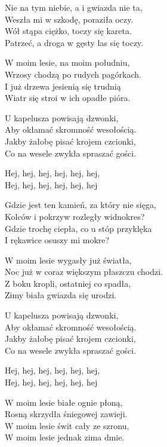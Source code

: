 \begin{text}
    Nie na tym niebie, a i gwiazda nie ta,\\
    Weszła mi w szkodę, poraziła oczy.\\
    Wół stąpa ciężko, toczy się kareta.\\
    Patrzeć, a droga w gęsty las się toczy.

    W moim lesie, na moim południu,\\
    Wrzosy chodzą po rudych pagórkach.\\
    I już drzewa jesienią się trudnią\\
    Wiatr się stroi w ich opadłe pióra.

    U kapelusza powisają dzwonki,\\
    Aby okłamać skromność wesołością.\\
    Jakby żałobę pisać krojem czcionki,\\
    Co na wesele zwykła spraszać gości.

    Hej, hej, hej, hej, hej, hej,\\
    Hej, hej, hej, hej, hej, hej

    Gdzie jest ten kamień, za który nie sięga,\\
    Kolców i pokrzyw rozległy widnokres?\\
    Gdzie trochę ciepła, co u stóp przyklęka\\
    I rękawice osuszy mi mokre?

    W moim lesie wygasły już światła,\\
    Noc już w coraz większym płaszczu chodzi.\\
    Z boku kropli, ostatniej co spadła,\\
    Zimy biała gwiazda się urodzi.

    U kapelusza powisają dzwonki,\\
    Aby okłamać skromność wesołością.\\
    Jakby żałobę pisać krojem czcionki,\\
    Co na wesele zwykła spraszać gości.

    Hej, hej, hej, hej, hej, hej,\\
    Hej, hej, hej, hej, hej, hej

    W moim lesie białe ognie płoną,\\
    Rosną skrzydła śniegowej zawieji.\\
    W moim lesie świt cały ze szronu,\\
    W moim lesie jednak zima dmie.
\end{text}
\begin{chord}

\end{chord}